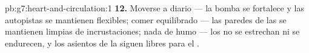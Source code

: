 \begin{solution}{pb:g7:heart-and-circulation:1}
\textbf{12.} Moverse a diario --- la bomba se fortalece y las autopistas
se mantienen flexibles; comer equilibrado --- las paredes de las
 se mantienen limpias de incrustaciones; nada de humo --- los
 no se estrechan ni se endurecen, y los asientos de la 
siguen libres para el .
\end{solution}
